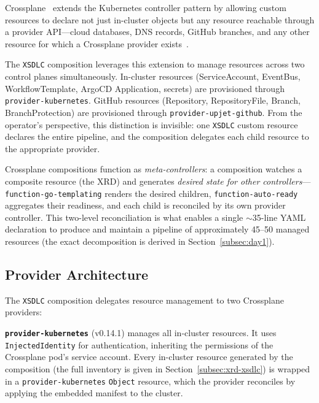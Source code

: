 Crossplane~\cite{crossplane} extends the Kubernetes controller pattern by allowing custom resources to declare not just in-cluster objects but any resource reachable through a provider API---cloud databases, DNS records, GitHub branches, and any other resource for which a Crossplane provider exists~\cite{crossplane-compositions}.

The \texttt{XSDLC} composition leverages this extension to manage resources across two control planes simultaneously. In-cluster resources (ServiceAccount, EventBus, WorkflowTemplate, ArgoCD Application, secrets) are provisioned through \texttt{provider-kubernetes}. GitHub resources (Repository, RepositoryFile, Branch, BranchProtection) are provisioned through \texttt{provider-upjet-github}. From the operator's perspective, this distinction is invisible: one \texttt{XSDLC} custom resource declares the entire pipeline, and the composition delegates each child resource to the appropriate provider.

Crossplane compositions function as \textit{meta-controllers}: a composition watches a composite resource (the XRD) and generates \textit{desired state for other controllers}---\texttt{function-go-templating} renders the desired children, \texttt{function-auto-ready} aggregates their readiness, and each child is reconciled by its own provider controller. This two-level reconciliation is what enables a single \(\sim\)35-line YAML declaration to produce and maintain a pipeline of approximately 45--50 managed resources (the exact decomposition is derived in Section~\ref{subsec:day1}).

\subsection{Provider Architecture}
\label{subsec:provider-architecture}

The \texttt{XSDLC} composition delegates resource management to two Crossplane providers:

\textbf{\texttt{provider-kubernetes}} (v0.14.1) manages all in-cluster resources. It uses \texttt{InjectedIdentity} for authentication, inheriting the permissions of the Crossplane pod's service account. Every in-cluster resource generated by the composition (the full inventory is given in Section~\ref{subsec:xrd-xsdlc}) is wrapped in a \texttt{provider-kubernetes} \texttt{Object} resource, which the provider reconciles by applying the embedded manifest to the cluster.

